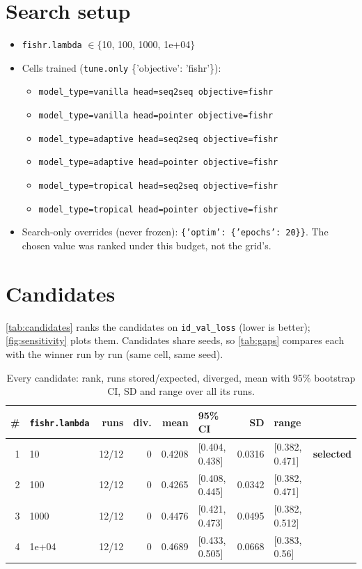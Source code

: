 \documentclass[10pt]{article}
\begin{document}
\section{Search setup}
\begin{itemize}\setlength\itemsep{0pt}
\item \texttt{fishr.lambda} $\in \{$10, 100, 1000, 1e+04$\}$
\item Cells trained (\texttt{tune.only} \{'objective': 'fishr'\}):
\begin{itemize}\setlength\itemsep{0pt}
\item \texttt{model\_type=vanilla head=seq2seq objective=fishr}
\item \texttt{model\_type=vanilla head=pointer objective=fishr}
\item \texttt{model\_type=adaptive head=seq2seq objective=fishr}
\item \texttt{model\_type=adaptive head=pointer objective=fishr}
\item \texttt{model\_type=tropical head=seq2seq objective=fishr}
\item \texttt{model\_type=tropical head=pointer objective=fishr}
\end{itemize}
\item Search-only overrides (never frozen): \texttt{\{'optim': \{'epochs': 20\}\}}. The chosen value was ranked under this budget, not the grid's.
\end{itemize}

\section{Candidates}
\autoref{tab:candidates} ranks the candidates on \texttt{id\_val\_loss} (lower is better); \autoref{fig:sensitivity} plots them.
Candidates share seeds, so \autoref{tab:gaps} compares each with the winner run by run (same cell, same seed).

{\small
\begin{longtable}{rlrrrlrll}
\caption{Every candidate: rank, runs stored/expected, diverged, mean with 95\% bootstrap CI, SD and range over all its runs.}\label{tab:candidates}\\
\toprule
\# & \texttt{fishr.lambda} & runs & div. & mean & 95\% CI & SD & range & \\
\midrule
\endhead
1 & 10 & 12/12 & 0 & 0.4208 & [0.404, 0.438] & 0.0316 & [0.382, 0.471] & \textbf{selected}\\
2 & 100 & 12/12 & 0 & 0.4265 & [0.408, 0.445] & 0.0342 & [0.382, 0.471] & \\
3 & 1000 & 12/12 & 0 & 0.4476 & [0.421, 0.473] & 0.0495 & [0.382, 0.512] & \\
4 & 1e+04 & 12/12 & 0 & 0.4689 & [0.433, 0.505] & 0.0668 & [0.383, 0.56] & \\
\bottomrule
\end{longtable}
}
\end{document}
